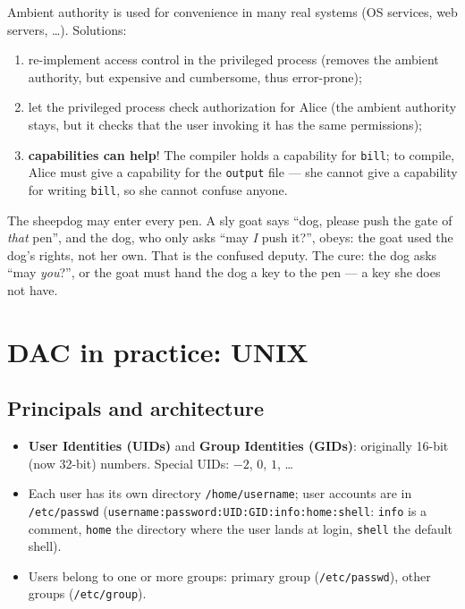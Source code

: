 \begin{algbox}[title=How to avoid confused deputies]
Ambient authority is used for convenience in many real systems (OS services, web
servers, \ldots). Solutions:
\begin{enumerate}
  \item re-implement access control in the privileged process (removes the ambient authority,
        but expensive and cumbersome, thus error-prone);
  \item let the privileged process check authorization for Alice (the ambient authority stays,
        but it checks that the user invoking it has the same permissions);
  \item \textbf{capabilities can help}! The compiler holds a capability for
        \texttt{bill}; to compile, Alice must give a capability for the
        \texttt{output} file --- she cannot give a capability for writing
        \texttt{bill}, so she cannot confuse anyone.
\end{enumerate}
\end{algbox}

\begin{goatbox}
The sheepdog may enter every pen. A sly goat says ``dog, please push the gate of \emph{that}
pen'', and the dog, who only asks ``may \emph{I} push it?'', obeys: the goat used the dog's
rights, not her own. That is the confused deputy. The cure: the dog asks ``may \emph{you}?'', or
the goat must hand the dog a key to the pen --- a key she does not have.
\end{goatbox}

\section{DAC in practice: UNIX}

\subsection{Principals and architecture}

\begin{defnbox}[title=UNIX principals and groups]
\begin{itemize}
  \item \textbf{User Identities (UIDs)} and \textbf{Group Identities (GIDs)}:
        originally 16-bit (now 32-bit) numbers. Special UIDs: $-2$, $0$, $1$, \ldots
  \item Each user has its own directory \texttt{/home/username}; user accounts are in
        \texttt{/etc/passwd} (\texttt{username:password:UID:GID:info:home:shell}: \texttt{info}
        is a comment, \texttt{home} the directory where the user lands at login, \texttt{shell}
        the default shell).
  \item Users belong to one or more groups: primary group (\texttt{/etc/passwd}),
        other groups (\texttt{/etc/group}).
\end{itemize}
\end{defnbox}

